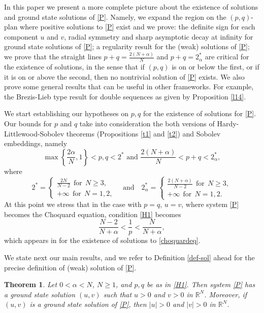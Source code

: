 \documentclass[12pt,a4paper]{article}
\newtheorem{theorem}{Theorem}[section]
\numberwithin{equation}{section}
\begin{document}
In this paper we present a more complete picture about the existence of solutions and ground state solutions of \eqref{P}. Namely, we expand the region on the $(p, q)$-plan where positive solutions to \eqref{P} exist and we prove: the definite sign for each component $u$ and $v$, radial symmetry and sharp asymptotic decay at infinity for ground state solutions of \eqref{P}; a regularity result for the (weak) solutions of \eqref{P}; we prove that the straight lines $p+q=\frac{2(N+\alpha)}{N}$ and $ p+ q = 2^{*}_{\alpha}$ are critical for the existence of solutions, in the sense that if $(p,q)$ is on or below the first, or if it is on or above the second, then no nontrivial solution of \eqref{P} exists. We also prove some general results that can be useful in other frameworks. For example, the Brezis-Lieb type result for double sequences as given by Proposition \ref{l14}.

We start establishing our hypotheses on $p, q$ for the existence of solutions for \eqref{P}. Our bounds for $p$ and $q$ take into consideration the both versions of Hardy-Littlewood-Sobolev theorems (Propositions \ref{t1} and \ref{t2}) and Sobolev embeddings, namely
\begin{equation}\label{H1}
\tag{H1}
\max\left\{\dfrac{2\alpha}{N}, 1\right\} < p, q < 2^{*} \mbox{ \ \ and \ \ } \dfrac{2(N+\alpha)}{N}< p+ q < 2^{*}_{\alpha},
\end{equation}
where
\[
2^* = \left\{ \begin{array}{l}\frac{2N}{N-2} \ \ \text{for} \ \ N\geq 3,\\ +\infty \ \ \text{for} \ \ N =1,2, \end{array}\right. \quad \text{and} \quad 2^*_{\alpha} = \left\{ \begin{array}{l}\frac{2(N+\alpha)}{N-2} \ \ \text{for} \ \ N\geq 3,\\ +\infty \ \ \text{for} \ \ N =1,2. \end{array} \right.
\]
At this point we stress that in the case with $p=q$, $u=v$, where system \eqref{P} becomes the Choquard equation, condition \eqref{H1} becomes 
\[
\frac{N-2}{N+\alpha} < \frac{1}{p} < \frac{N}{N+\alpha},
\] 
which appears in \cite{Moroz2013} for the existence of solutions to \eqref{choquardeq}. 

We state next our main results, and we refer to Definition \ref{def-sol} ahead for the precise definition of (weak) solution of \eqref{P}.
			
			
\begin{theorem}\label{t3}
Let $0<\alpha< N$, $N\geq 1$, and $p, q$ be as in \eqref{H1}. Then system \eqref{P} has a ground state solution $(u, v)$ such that $u>0$ and $v>0$ in $\mathbb{R}^N$. Moreover, if $(u, v)$ is a ground state solution of \eqref{P}, then $|u| >0$ and $|v|>0$ in $\mathbb{R}^N$.
\end{theorem}
\end{document}
